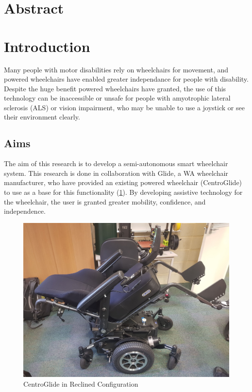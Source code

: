 \documentclass[12pt]{article}
\begin{document}

\thispagestyle{empty}
\pagebreak

\section*{Abstract}
\pagebreak

\renewcommand{\contentsname}{Table of Contents}
\tableofcontents
\pagebreak
\listoffigures
\listoftables
\pagebreak





\section{Introduction}
Many people with motor disabilities rely on wheelchairs for movement, and
powered wheelchairs have enabled greater independance for people with disability.
Despite the huge benefit powered wheelchairs have granted,
the use of this technology can be inaccessible or unsafe for people
with amyotrophic lateral sclerosis (ALS) or vision impairment,
who may be unable to use a joystick or see their environment clearly.


\subsection{Aims}
The aim of this research is to develop a semi-autonomous smart wheelchair system.
This research is done in collaboration with Glide, a WA wheelchair manufacturer,
who have provided an existing powered wheelchair (CentroGlide) to use as a base
for this functionality (\cref{fig:wheelchair_reclined}). By developing assistive technology for the wheelchair,
the user is granted greater mobility, confidence, and independence.

\begin{figure}[H]
    \centering
    \includegraphics[width=0.6\linewidth]{images/wheelchair_reclined.jpg}
    \caption{CentroGlide in Reclined Configuration}
    \label{fig:wheelchair_reclined}
\end{figure}
\end{document}
